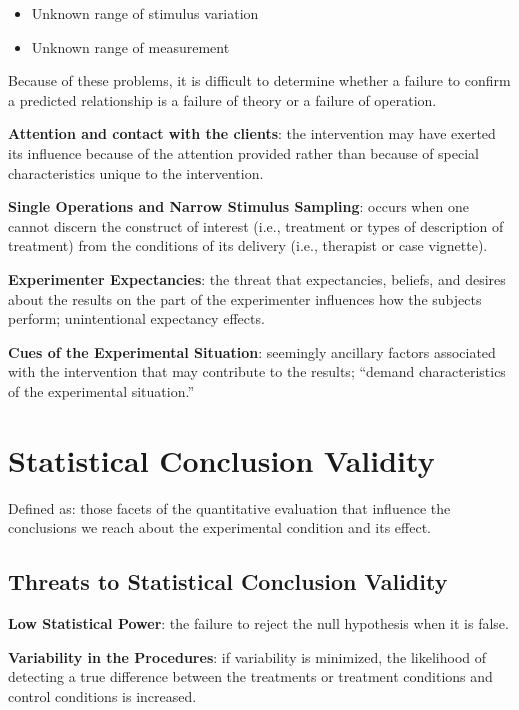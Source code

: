 \documentclass[
  english,
]{book}
\providecommand{\tightlist}{%
  \setlength{\itemsep}{0pt}\setlength{\parskip}{0pt}}
\begin{document}
\begin{itemize}
\tightlist
\item
  Unknown range of stimulus variation
\item
  Unknown range of measurement
\end{itemize}

Because of these problems, it is difficult to determine whether a failure to confirm a predicted relationship is a failure of theory or a failure of operation.

\textbf{Attention and contact with the clients}: the intervention may have exerted its influence because of the attention provided rather than because of special characteristics unique to the intervention.

\textbf{Single Operations and Narrow Stimulus Sampling}: occurs when one cannot discern the construct of interest (i.e., treatment or types of description of treatment) from the conditions of its delivery (i.e., therapist or case vignette).

\textbf{Experimenter Expectancies}: the threat that expectancies, beliefs, and desires about the results on the part of the experimenter influences how the subjects perform; unintentional expectancy effects.

\textbf{Cues of the Experimental Situation}: seemingly ancillary factors associated with the intervention that may contribute to the results; ``demand characteristics of the experimental situation.''

\hypertarget{statistical-conclusion-validity}{%
\section{Statistical Conclusion Validity}\label{statistical-conclusion-validity}}

Defined as: those facets of the quantitative evaluation that influence the conclusions we reach about the experimental condition and its effect.

\hypertarget{threats-to-statistical-conclusion-validity}{%
\subsection{Threats to Statistical Conclusion Validity}\label{threats-to-statistical-conclusion-validity}}

\textbf{Low Statistical Power}: the failure to reject the null hypothesis when it is false.

\textbf{Variability in the Procedures}: if variability is minimized, the likelihood of detecting a true difference between the treatments or treatment conditions and control conditions is increased.
\end{document}
